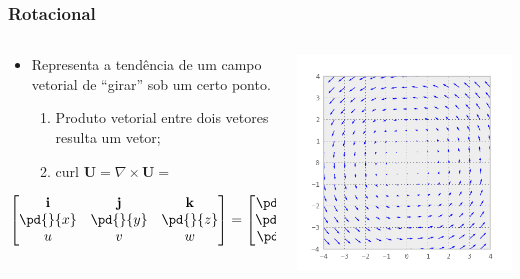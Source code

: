 \begin{frame}
\frametitle{Rotacional}

  \begin{columns}
    \begin{column}{0.5\textwidth}
        \begin{itemize}[<+-| alert@+>]
          \item Representa a tendência de um campo vetorial de ``girar'' sob um
                certo ponto.
            \begin{enumerate}[<+-| alert@+>]
              \item Produto vetorial entre dois vetores resulta um vetor;
              \item $\text{curl } \mathbf{U} = \nabla \times \mathbf{U} = $
            \end{enumerate}
        \end{itemize}  \pause
                \begin{equation*}
                  \begin{bmatrix}
                    \mathbf{i} & \mathbf{j} & \mathbf{k}\\
                    \pd{}{x} & \pd{}{y} & \pd{}{z}\\
                    u & v & w
                  \end{bmatrix} =
                  \begin{bmatrix}
                    \pd{w}{y} - \pd{v}{z}\\
                    \pd{u}{z} - \pd{w}{x}\\
                    \pd{v}{x} - \pd{u}{y}
                  \end{bmatrix}
                \end{equation*}
    \end{column}
    \pause
    \begin{column}{0.5\textwidth}
      \begin{center}
        \includegraphics[scale=0.55]{./figures/curl.png}
      \end{center}
    \end{column}
  \end{columns}

\end{frame}

